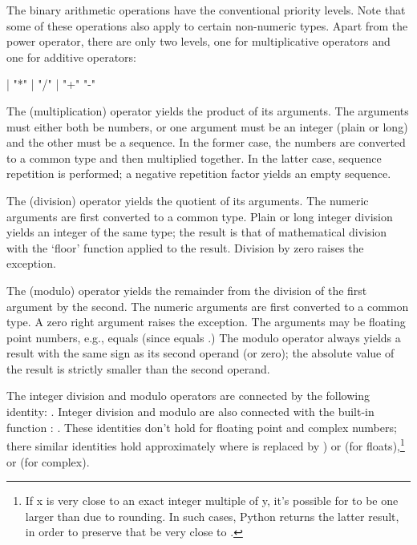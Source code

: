 The binary arithmetic operations have the conventional priority
levels.  Note that some of these operations also apply to certain
non-numeric types.  Apart from the power operator, there are only two
levels, one for multiplicative operators and one for additive
operators:

\begin{productionlist}
             { |  "*" 
              |  "/" }
             { |  "+" 
               "-" }
\end{productionlist}

The \code{*} (multiplication) operator yields the product of its
arguments.  The arguments must either both be numbers, or one argument
must be an integer (plain or long) and the other must be a sequence.
In the former case, the numbers are converted to a common type and
then multiplied together.  In the latter case, sequence repetition is
performed; a negative repetition factor yields an empty sequence.

The \code{/} (division) operator yields the quotient of its
arguments.  The numeric arguments are first converted to a common
type.  Plain or long integer division yields an integer of the same
type; the result is that of mathematical division with the `floor'
function applied to the result.  Division by zero raises the
 exception.

The \code{\%} (modulo) operator yields the remainder from the
division of the first argument by the second.  The numeric arguments
are first converted to a common type.  A zero right argument raises
the  exception.  The arguments may be floating
point numbers, e.g.,  equals  (since
 equals .)  The modulo operator always
yields a result with the same sign as its second operand (or zero);
the absolute value of the result is strictly smaller than the second
operand.

The integer division and modulo operators are connected by the
following identity: .  Integer division and
modulo are also connected with the built-in function :
.  These identities don't hold for
floating point and complex numbers; there similar identities hold
approximately where  is replaced by ) or
 (for floats),\footnote{
    If x is very close to an exact integer multiple of y, it's
    possible for  to be one larger than
     due to rounding.  In such cases, Python returns
    the latter result, in order to preserve that  be very close to .
} or  (for
complex).

